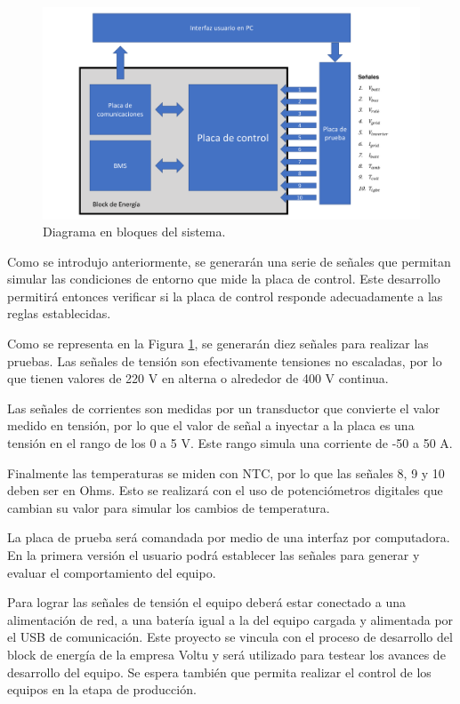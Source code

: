 \documentclass[
11pt, %
codirector, %
]{charter}
\begin{document}
\begin{figure}[htpb]
	\centering
	\includegraphics[width=1\textwidth]{./Figuras/DiagramaEnBloqueDelProyecto.pdf}
	\caption{Diagrama en bloques del sistema.}
	\label{fig:diagBloques}
\end{figure}

\vspace{25px}

Como se introdujo anteriormente, se generarán una serie de señales que permitan simular las condiciones de entorno que mide la placa de control.
Este desarrollo permitirá entonces verificar si la placa de control responde adecuadamente a las reglas establecidas.

Como se representa en la Figura \ref{fig:diagBloques}, se generarán diez señales para realizar las pruebas. Las señales de tensión son efectivamente tensiones no escaladas, por lo que tienen valores de 220 V en alterna o alrededor de 400 V continua.

Las señales de corrientes son medidas por un transductor que convierte el valor medido en tensión, por lo que el valor de señal a inyectar a la placa es una tensión en el rango de los 0 a 5 V. Este rango simula una corriente de -50 a 50 A.

Finalmente las temperaturas se miden con NTC, por lo que las señales 8, 9 y 10 deben ser en Ohms. Esto se realizará con el uso de potenciómetros digitales que cambian su valor para simular los cambios de temperatura.

La placa de prueba será comandada por medio de una interfaz por computadora. En la primera versión el usuario podrá establecer las señales para generar y evaluar el comportamiento del equipo.

Para lograr las señales de tensión el equipo deberá estar conectado a una alimentación de red, a una batería igual a la del equipo cargada y alimentada por el USB de comunicación.
Este proyecto se vincula con el proceso de desarrollo del block de energía de la empresa Voltu y será utilizado para testear los avances de desarrollo del equipo. Se espera también que permita realizar el control de los equipos en la etapa de producción.
\end{document}
